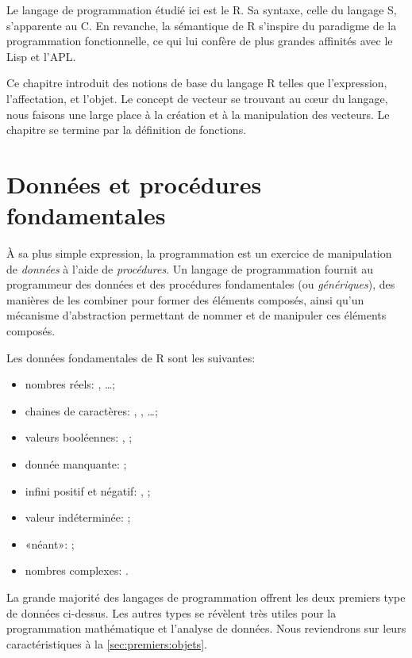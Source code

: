 Le langage de programmation étudié ici est le R. Sa syntaxe, celle du
langage S, s'apparente au C. En revanche, la
sémantique de R s'inspire du paradigme de la programmation
fonctionnelle, ce qui lui confère de plus grandes affinités avec le
Lisp et l'APL.

Ce chapitre introduit des notions de base du langage R telles que
l'expression, l'affectation, et l'objet. Le concept de vecteur se
trouvant au cœur du langage, nous faisons une large place à la
création et à la manipulation des vecteurs. Le chapitre se termine par
la définition de fonctions.


\section{Données et procédures fondamentales}
\label{sec:premiers:fondamentales}

À sa plus simple expression, la programmation est un exercice de
manipulation de \emph{données} à l'aide de \emph{procédures}. Un
langage de programmation fournit au programmeur des données et des
procédures fondamentales (ou \emph{génériques}), des manières de les
combiner pour former des éléments composés, ainsi qu'un mécanisme
d'abstraction permettant de nommer et de manipuler ces éléments
composés.

Les données fondamentales de R sont les suivantes:
\begin{itemize}
\item nombres réels: , \dots;
\item chaines de caractères: , , \dots;
\item valeurs booléennes: , ;
\item donnée manquante: ;
\item infini positif et négatif: , ;
\item valeur indéterminée: ;
\item «néant»: ;
\item nombres complexes: .
\end{itemize}
La grande majorité des langages de programmation offrent les deux
premiers type de données ci-dessus. Les autres types se révèlent très
utiles pour la programmation mathématique et l'analyse de données.
Nous reviendrons sur leurs caractéristiques à la
\autoref{sec:premiers:objets}.

